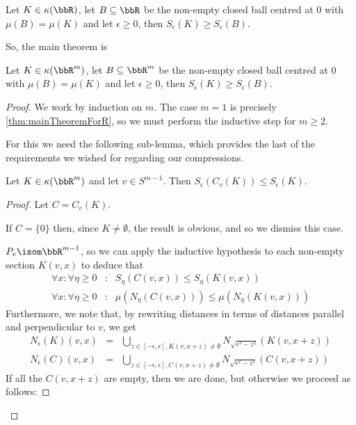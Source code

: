 \documentclass[a4paper,11pt]{article}
\begin{document}
\begin{corollary}
\label{thm:mainTheoremForR}
Let $K\in\kappa(\bbR)$, let $B\subseteq \bbR$ be the non-empty closed
ball centred at $0$ with $\mu(B)=\mu(K)$ and let $\epsilon\geq0$, then
$S_\epsilon(K)\geq S_\epsilon(B)$.
\end{corollary}

So, the main theorem is

\begin{thm}
Let $K\in\kappa(\bbR^m)$, let $B\subseteq \bbR^m$ be the non-empty closed
ball centred at $0$ with $\mu(B)=\mu(K)$ and let $\epsilon\geq0$, then
$S_\epsilon(K)\geq S_\epsilon(B)$.
\end{thm}

\begin{proof}
We work by induction on $m$.  The case $m=1$ is precisely
\ref{thm:mainTheoremForR}, so we must perform the inductive step for $m\geq2$.

For this we need the following sub-lemma, which provides the last of the
requirements we wished for regarding our compressions.

\begin{lemma}
\label{thm:compressionSurfaceAreaDecreasing}
Let $K\in\kappa(\bbR^m)$ and let $v\in S^{m-1}$.  Then
$S_\epsilon(C_v(K))\leq S_\epsilon(K)$.
\end{lemma}

\begin{proof}
Let $C=C_v(K)$.

If $C=\{0\}$ then, since $K\not=\emptyset$, the result is obvious, and so we
dismiss this case.

$P_v\isom\bbR^{m-1}$, so we can apply the inductive hypothesis to each
non-empty section $K(v,x)$ to deduce that
%
\begin{eqnarray*}
\forall x:\forall\eta\geq0 &:& S_\eta(C(v,x))\leq S_\eta(K(v,x)) \\
\forall x:\forall\eta\geq0 &:& \mu(N_\eta(C(v,x)))\leq \mu(N_\eta(K(v,x)))
\end{eqnarray*}
%
Furthermore, we note that, by rewriting distances in terms of distances
parallel and perpendicular to $v$, we get
%
\begin{eqnarray*}
N_\epsilon(K)(v,x) &=&
	\bigcup_{z\in[-\epsilon,\epsilon],K(v,x+z)\not=\emptyset}
	N_{\sqrt{\epsilon^2-z^2}}(K(v,x+z)) \\
N_\epsilon(C)(v,x) &=&
	\bigcup_{z\in[-\epsilon,\epsilon],C(v,x+z)\not=\emptyset}
	N_{\sqrt{\epsilon^2-z^2}}(C(v,x+z))
\end{eqnarray*}
%
If all the $C(v,x+z)$ are empty, then we are done, but otherwise we proceed as
follows:


\end{proof}
\end{proof}
\end{document}
